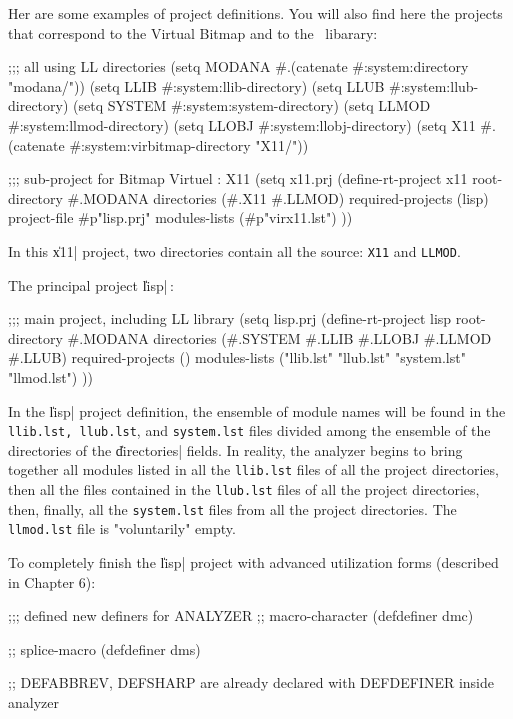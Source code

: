 Her are some examples of project definitions.  You will also find here the projects that correspond to the Virtual Bitmap and to the \LeLisp\ libarary:

\begin{Longcode*}
;;; all using LL directories
(setq MODANA #.(catenate #:system:directory "modana/"))
(setq LLIB   #:system:llib-directory)
(setq LLUB   #:system:llub-directory)
(setq SYSTEM #:system:system-directory)
(setq LLMOD  #:system:llmod-directory)
(setq LLOBJ  #:system:llobj-directory)
(setq X11    #.(catenate #:system:virbitmap-directory "X11/"))

;;; sub-project for Bitmap Virtuel : X11
(setq x11.prj
(define-rt-project x11
  root-directory \#.MODANA
  directories (\#.X11 \#.LLMOD)
  required-projects (lisp)
  project-file #p"lisp.prj"
  modules-lists (#p"virx11.lst")
))
\end{Longcode*}


In this \|x11| project, two directories contain all the source:  {\tt X11} and {\tt LLMOD}.

The principal project \|lisp|\,:


\begin{Longcode*}
;;; main project, including LL library
(setq lisp.prj
(define-rt-project lisp
  root-directory \#.MODANA
  directories (\#.SYSTEM
               \#.LLIB
               \#.LLOBJ
               \#.LLMOD
               \#.LLUB)
  required-projects ()
  modules-lists ("llib.lst" "llub.lst" "system.lst" "llmod.lst")
))
\end{Longcode*}

In the \|lisp| project definition, the ensemble of module
names will be found in the {\tt llib.lst,
llub.lst}, and {\tt system.lst} files divided among the ensemble of the directories of the \|directories| fields.  In reality, the analyzer begins to bring together all modules listed in all the {\tt llib.lst} files of all the project directories, then all the files contained in the {\tt llub.lst} files of all the project directories, then, finally, all the {\tt system.lst} files from all the project directories.  The {\tt llmod.lst} file is "voluntarily" empty. 

To completely finish the \|lisp| project with advanced utilization forms (described in Chapter 6):
\begin{Longcode*}
;;; defined new definers for ANALYZER
;; macro-character
(defdefiner dmc)

;; splice-macro
(defdefiner dms)

;; DEFABBREV, DEFSHARP are already declared with DEFDEFINER inside analyzer 
\end{Longcode*}


